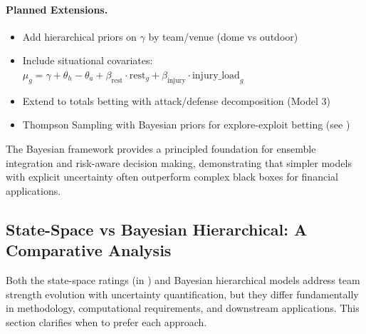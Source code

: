 \paragraph{Planned Extensions.}
\begin{itemize}
  \item Add hierarchical priors on $\gamma$ by team/venue (dome vs outdoor)
  \item Include situational covariates: $\mu_g = \gamma + \theta_h - \theta_a + \beta_{\text{rest}} \cdot \text{rest}_g + \beta_{\text{injury}} \cdot \text{injury\_load}_g$
  \item Extend to totals betting with attack/defense decomposition (Model 3)
  \item Thompson Sampling with Bayesian priors for explore-exploit betting (see )
\end{itemize}

The Bayesian framework provides a principled foundation for ensemble integration and risk-aware decision making, demonstrating that simpler models with explicit uncertainty often outperform complex black boxes for financial applications.

\subsection{State-Space vs Bayesian Hierarchical: A Comparative Analysis}
\label{subsec:ss-vs-bayes}

Both the state-space ratings (in ) and Bayesian hierarchical models address team strength evolution with uncertainty quantification, but they differ fundamentally in methodology, computational requirements, and downstream applications. This section clarifies when to prefer each approach.

